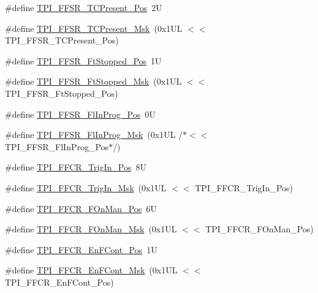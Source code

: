 \begin{DoxyCompactItemize}
\item 
\#define \hyperlink{group___c_m_s_i_s___t_p_i_gad30fde0c058da2ffb2b0a213be7a1b5c}{T\+P\+I\+\_\+\+F\+F\+S\+R\+\_\+\+T\+C\+Present\+\_\+\+Pos}~2U
\item 
\#define \hyperlink{group___c_m_s_i_s___t_p_i_ga0d6bfd263ff2fdec72d6ec9415fb1135}{T\+P\+I\+\_\+\+F\+F\+S\+R\+\_\+\+T\+C\+Present\+\_\+\+Msk}~(0x1\+U\+L $<$$<$ T\+P\+I\+\_\+\+F\+F\+S\+R\+\_\+\+T\+C\+Present\+\_\+\+Pos)
\item 
\#define \hyperlink{group___c_m_s_i_s___t_p_i_gaedf31fd453a878021b542b644e2869d2}{T\+P\+I\+\_\+\+F\+F\+S\+R\+\_\+\+Ft\+Stopped\+\_\+\+Pos}~1U
\item 
\#define \hyperlink{group___c_m_s_i_s___t_p_i_ga1ab6c3abe1cf6311ee07e7c479ce5f78}{T\+P\+I\+\_\+\+F\+F\+S\+R\+\_\+\+Ft\+Stopped\+\_\+\+Msk}~(0x1\+U\+L $<$$<$ T\+P\+I\+\_\+\+F\+F\+S\+R\+\_\+\+Ft\+Stopped\+\_\+\+Pos)
\item 
\#define \hyperlink{group___c_m_s_i_s___t_p_i_ga542ca74a081588273e6d5275ba5da6bf}{T\+P\+I\+\_\+\+F\+F\+S\+R\+\_\+\+Fl\+In\+Prog\+\_\+\+Pos}~0U
\item 
\#define \hyperlink{group___c_m_s_i_s___t_p_i_ga63dfb09259893958962914fc3a9e3824}{T\+P\+I\+\_\+\+F\+F\+S\+R\+\_\+\+Fl\+In\+Prog\+\_\+\+Msk}~(0x1\+U\+L /$\ast$$<$$<$ T\+P\+I\+\_\+\+F\+F\+S\+R\+\_\+\+Fl\+In\+Prog\+\_\+\+Pos$\ast$/)
\item 
\#define \hyperlink{group___c_m_s_i_s___t_p_i_gaa7ea11ba6ea75b541cd82e185c725b5b}{T\+P\+I\+\_\+\+F\+F\+C\+R\+\_\+\+Trig\+In\+\_\+\+Pos}~8U
\item 
\#define \hyperlink{group___c_m_s_i_s___t_p_i_ga360b413bc5da61f751546a7133c3e4dd}{T\+P\+I\+\_\+\+F\+F\+C\+R\+\_\+\+Trig\+In\+\_\+\+Msk}~(0x1\+U\+L $<$$<$ T\+P\+I\+\_\+\+F\+F\+C\+R\+\_\+\+Trig\+In\+\_\+\+Pos)
\item 
\#define \hyperlink{group___c_m_s_i_s___t_p_i_gac57b0b588a37a870573560bc6316cbcc}{T\+P\+I\+\_\+\+F\+F\+C\+R\+\_\+\+F\+On\+Man\+\_\+\+Pos}~6U
\item 
\#define \hyperlink{group___c_m_s_i_s___t_p_i_ga7aeb30af62d04e852a55c3bd64c1bd2c}{T\+P\+I\+\_\+\+F\+F\+C\+R\+\_\+\+F\+On\+Man\+\_\+\+Msk}~(0x1\+U\+L $<$$<$ T\+P\+I\+\_\+\+F\+F\+C\+R\+\_\+\+F\+On\+Man\+\_\+\+Pos)
\item 
\#define \hyperlink{group___c_m_s_i_s___t_p_i_ga99e58a0960b275a773b245e2b69b9a64}{T\+P\+I\+\_\+\+F\+F\+C\+R\+\_\+\+En\+F\+Cont\+\_\+\+Pos}~1U
\item 
\#define \hyperlink{group___c_m_s_i_s___t_p_i_ga27d1ecf2e0ff496df03457a2a97cb2c9}{T\+P\+I\+\_\+\+F\+F\+C\+R\+\_\+\+En\+F\+Cont\+\_\+\+Msk}~(0x1\+U\+L $<$$<$ T\+P\+I\+\_\+\+F\+F\+C\+R\+\_\+\+En\+F\+Cont\+\_\+\+Pos)
$$
\end{DoxyCompactItemize}
